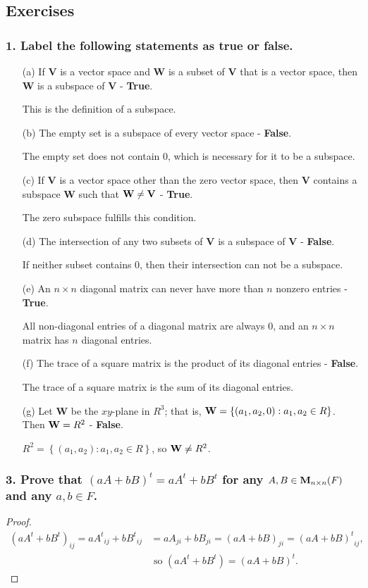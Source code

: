 \documentclass{article}
\begin{document}
\subsection*{Exercises}
\subsubsection*{1. Label the following statements as true or false.}
\begin{enumerate}
	\item[(a)] If \textbf{V} is a vector space and \textbf{W} is a subset of \textbf{V} that is a vector space, then \textbf{W} is a subspace of \textbf{V} - \textbf{True}.

	This is the definition of a subspace.
	\item[(b)] The empty set is a subspace of every vector space - \textbf{False}.
	
	The empty set does not contain 0, which is necessary for it to be a subspace.
	\item[(c)] If \textbf{V} is a vector space other than the zero vector space, then \textbf{V} contains a subspace \textbf{W} such that $\textbf{\textup{W}} \ne \textbf{\textup{V}}$ - \textbf{True}.
	
	The zero subspace fulfills this condition.
	\item[(d)] The intersection of any two subsets of \textbf{V} is a subspace of \textbf{V} - \textbf{False}.
	
	If neither subset contains 0, then their intersection can not be a subspace.
	\item[(e)] An $n \times n$ diagonal matrix can never have more than $n$ nonzero entries - \textbf{True}.
	
	All non-diagonal entries of a diagonal matrix are always 0, and an $n \times n$ matrix has $n$ diagonal entries.
	\item[(f)] The trace of a square matrix is the product of its diagonal entries - \textbf{False}.
	
	The trace of a square matrix is the sum of its diagonal entries.
	\item[(g)] Let \textbf{W} be the $xy$-plane in $R^3$; that is, $\textbf{\textup{W}} = \left\{(a_1, a_2, 0): a_1, a_2 \in R\right\}$. Then $\textbf{\textup{W}} = R^2$ - \textbf{False}.
	
	$R^2 = \left\{(a_1, a_2): a_1,a_2 \in R\right\}$, so $\textbf{\textup{W}} \ne R^2$.
\end{enumerate}

\subsubsection*{3. Prove that $(aA + bB)^t = aA^t + bB^t$ for any $A,B \in \textbf{\textup{M}}_{n \times n}(F)$ and any $a, b \in F$.}
\begin{proof}
	\begin{align*}
		(aA^t + bB^t)_{ij} = {aA^t}_{ij} + {bB^t}_{ij} &= aA_{ji} + bB_{ji} = (aA+bB)_{ji} = {(aA+bB)^t}_{ij},\\& \text{ so } (aA^t + bB^t) = (aA + bB)^t.
	\end{align*}
\end{proof}
\end{document}
